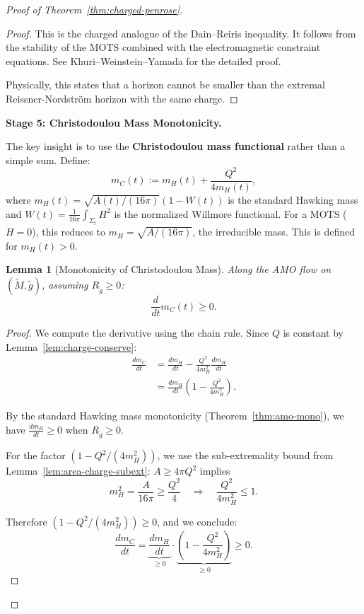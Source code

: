 \documentclass[12pt]{article}
\theoremstyle{plain}
\newtheorem{lemma}[theorem]{Lemma}
\theoremstyle{definition}
\theoremstyle{remark}
\begin{document}
\begin{proof}[Proof of Theorem~\ref{thm:charged-penrose}]
\begin{proof}
This is the charged analogue of the Dain--Reiris inequality. It follows from the stability of the MOTS combined with the electromagnetic constraint equations. See Khuri--Weinstein--Yamada \cite{khuri2017} for the detailed proof.

Physically, this states that a horizon cannot be smaller than the extremal Reissner-Nordstr\"om horizon with the same charge.
\end{proof}

\textbf{Stage 5: Christodoulou Mass Monotonicity.}

The key insight is to use the \textbf{Christodoulou mass functional} rather than a simple sum. Define:
\begin{equation}
    m_C(t) := m_H(t) + \frac{Q^2}{4m_H(t)},
\end{equation}
where $m_H(t) = \sqrt{A(t)/(16\pi)}(1 - W(t))$ is the standard Hawking mass and $W(t) = \frac{1}{16\pi}\int_{\Sigma_t} H^2$ is the normalized Willmore functional. For a MOTS ($H=0$), this reduces to $m_H = \sqrt{A/(16\pi)}$, the irreducible mass. This is defined for $m_H(t) > 0$.

\begin{lemma}[Monotonicity of Christodoulou Mass]\label{lem:mC-monotone}
Along the AMO flow on $(\tilde{M}, \tilde{g})$, assuming $R_{\tilde{g}} \geq 0$:
\begin{equation}
    \frac{d}{dt} m_C(t) \geq 0.
\end{equation}
\end{lemma}

\begin{proof}
We compute the derivative using the chain rule. Since $Q$ is constant by Lemma~\ref{lem:charge-conserve}:
\begin{align}
\frac{d m_C}{dt} &= \frac{d m_H}{dt} - \frac{Q^2}{4m_H^2}\frac{d m_H}{dt} \\
&= \frac{d m_H}{dt}\left(1 - \frac{Q^2}{4m_H^2}\right).
\end{align}

By the standard Hawking mass monotonicity (Theorem~\ref{thm:amo-mono}), we have $\frac{d m_H}{dt} \geq 0$ when $R_{\tilde{g}} \geq 0$.

For the factor $(1 - Q^2/(4m_H^2))$, we use the sub-extremality bound from Lemma~\ref{lem:area-charge-subext}: $A \geq 4\pi Q^2$ implies
\[
m_H^2 = \frac{A}{16\pi} \geq \frac{Q^2}{4} \quad \Rightarrow \quad \frac{Q^2}{4m_H^2} \leq 1.
\]

Therefore $(1 - Q^2/(4m_H^2)) \geq 0$, and we conclude:
\[
\frac{d m_C}{dt} = \underbrace{\frac{d m_H}{dt}}_{\geq 0} \cdot \underbrace{\left(1 - \frac{Q^2}{4m_H^2}\right)}_{\geq 0} \geq 0.
\]
\end{proof}


\end{proof}
\end{document}
